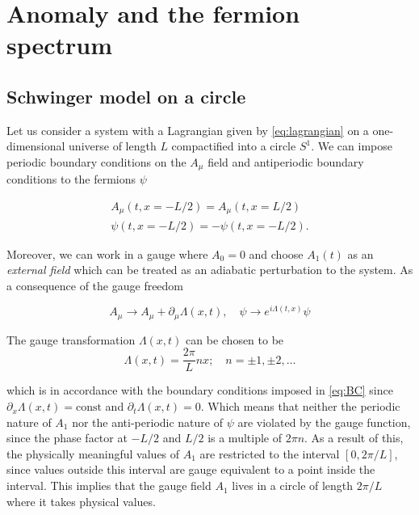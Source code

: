 

\section{Anomaly and the fermion spectrum}\label{sec:FermionSpectrum}

\subsection{Schwinger model on a circle}\label{ssec:SchCircle}

Let us consider a system with a Lagrangian given by \eqref{eq:lagrangian} on a one-dimensional universe of length $L$ compactified into a circle $S^1$. We can impose periodic boundary conditions on the $A_\mu$ field and antiperiodic boundary conditions to the fermions $\psi$

\begin{align}
	A_\mu(t,x=-L/2) = A_\mu(t,x=L/2)\nonumber\\
	\psi(t,x=-L/2) = - \psi(t,x=-L/2)\label{eq:BC}.
\end{align}

Moreover, we can work in a gauge where $A_0=0$ and choose $A_1(t)$ as an \emph{external field} which can be treated as an adiabatic perturbation to the system. As a consequence of the gauge freedom 

\begin{equation*}
	A_\mu \to A_\mu + \partial_\mu \Lambda(x,t), \quad \psi \to e^{i\Lambda(t,x)}\psi
\end{equation*}

The gauge transformation $\Lambda(x,t)$ can be chosen to be
\begin{equation}
\Lambda(x,t) = \frac{2\pi}{L} nx;\quad n=\pm1,\pm2,\ldots
\end{equation}

which is in accordance with the boundary conditions imposed in \eqref{eq:BC} since $\partial_x\Lambda(x,t) = \text{const}$ and $\partial_t\Lambda(x,t) = 0 $. Which means that neither the periodic nature of $A_1$ nor the anti-periodic nature of $\psi$ are violated by the gauge function, since the phase factor at $-L/2$ and $L/2$ is a multiple of $2\pi n$. As a result of this, the physically meaningful values of $A_1$ are restricted to the interval $[0,2\pi/L]$, since values outside this interval are gauge equivalent to a point inside the interval. This implies that the gauge field $A_1$ lives in a circle of length $2\pi/L$ where it takes physical values. \\

